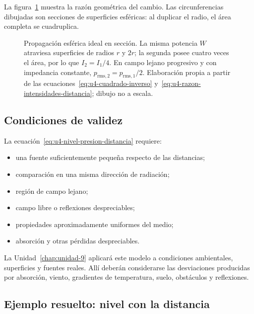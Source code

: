 La figura~\ref{fig:u4-propagacion-esferica} muestra la razón geométrica del
cambio. Las circunferencias dibujadas son secciones de superficies esféricas:
al duplicar el radio, el área completa se cuadruplica.

\begin{figure}[htbp]
    \centering
    
    \caption{Propagación esférica ideal en sección. La misma potencia \(W\)
    atraviesa superficies de radios \(r\) y \(2r\); la segunda posee cuatro
    veces el área, por lo que \(I_2=I_1/4\). En campo lejano progresivo y con
    impedancia constante, \(p_{\mathrm{rms},2}=p_{\mathrm{rms},1}/2\).
    Elaboración propia a partir de las
    ecuaciones~\eqref{eq:u4-cuadrado-inverso}
    y~\eqref{eq:u4-razon-intensidades-distancia}; dibujo no a escala.}
    \label{fig:u4-propagacion-esferica}
\end{figure}

\subsection{Condiciones de validez}
\label{sec:u4-condiciones-cuadrado-inverso}

La ecuación~\eqref{eq:u4-nivel-presion-distancia} requiere:

\begin{itemize}
    \item una fuente suficientemente pequeña respecto de las distancias;
    \item comparación en una misma dirección de radiación;
    \item región de campo lejano;
    \item campo libre o reflexiones despreciables;
    \item propiedades aproximadamente uniformes del medio;
    \item absorción y otras pérdidas despreciables.
\end{itemize}

La Unidad~\ref{chap:unidad-9} aplicará este modelo a condiciones ambientales,
superficies y fuentes reales. Allí deberán considerarse las desviaciones
producidas por absorción, viento, gradientes de temperatura, suelo, obstáculos
y reflexiones.

\subsection{Ejemplo resuelto: nivel con la distancia}
\label{sec:u4-ejemplo-distancia}

